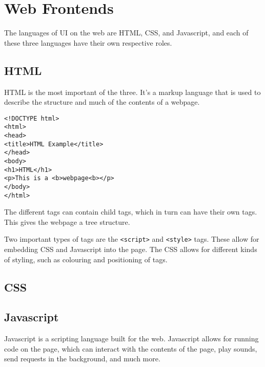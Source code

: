 \section{Web Frontends}
The languages of UI on the web are HTML, CSS, and Javascript, and each of these three languages have their own respective roles.\cite{nixonweb}
\subsection{HTML}
HTML is the most important of the three.
It's a markup language that is used to describe the structure and much of the contents of a webpage.
\begin{lstlisting}
<!DOCTYPE html>
<html>
<head>
<title>HTML Example</title>
</head>
<body>
<h1>HTML</h1>
<p>This is a <b>webpage<b></p>
</body>
</html>
\end{lstlisting}
The different tags can contain child tags, which in turn can have their own tags.
This gives the webpage a tree structure.

Two important types of tags are the \texttt{<script>} and \texttt{<style>} tags.
These allow for embedding CSS and Javascript into the page.
The CSS allows for different kinds of styling, such as colouring and positioning of tags.
\subsection{CSS}
\subsection{Javascript}
Javascript is a scripting language built for the web.
Javascript allows for running code on the page, which can interact with the contents of the page, play sounds, send requests in the background, and much more.\cite{nixonweb}
